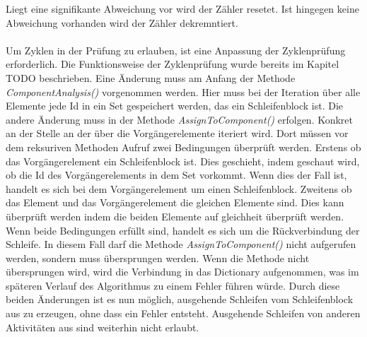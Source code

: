 \documentclass{article}
\begin{document}
    Liegt eine signifikante Abweichung vor wird der Zähler resetet. Ist hingegen keine Abweichung vorhanden wird der Zähler dekremntiert.\\
    \\
    Um Zyklen in der Prüfung zu erlauben, ist eine Anpassung der Zyklenprüfung erforderlich.
    Die Funktionsweise der Zyklenprüfung wurde bereits im Kapitel TODO beschrieben.
    Eine Änderung muss am Anfang der Methode \textit{ComponentAnalysis()} vorgenommen werden.
    Hier muss bei der Iteration über alle Elemente jede Id in ein Set gespeichert werden, das ein Schleifenblock ist.
    Die andere Änderung muss in der Methode \textit{AssignToComponent()} erfolgen.
    Konkret an der Stelle an der über die Vorgängerelemente iteriert wird.
    Dort müssen vor dem reksuriven Methoden Aufruf zwei Bedingungen überprüft werden.
    Erstens ob das Vorgängerelement ein Schleifenblock ist.
    Dies geschieht, indem geschaut wird, ob die Id des Vorgängerelements in dem Set vorkommt. 
    Wenn dies der Fall ist, handelt es sich bei dem Vorgängerelement um einen Schleifenblock.
    Zweitens ob das Element und das Vorgängerelement die gleichen Elemente sind.
    Dies kann überprüft werden indem die beiden Elemente auf gleichheit überprüft werden.
    Wenn beide Bedingungen erfüllt sind, handelt es sich um die Rückverbindung der Schleife. 
    In diesem Fall darf die Methode \textit{AssignToComponent()} nicht aufgerufen werden, sondern muss übersprungen werden.
    Wenn die Methode nicht übersprungen wird, wird die Verbindung in das Dictionary aufgenommen, was im späteren Verlauf des Algorithmus zu einem Fehler führen würde.
    Durch diese beiden Änderungen ist es nun möglich, ausgehende Schleifen vom Schleifenblock aus zu erzeugen, ohne dass ein Fehler entsteht.
    Ausgehende Schleifen von anderen Aktivitäten aus sind weiterhin nicht erlaubt.
\end{document}
